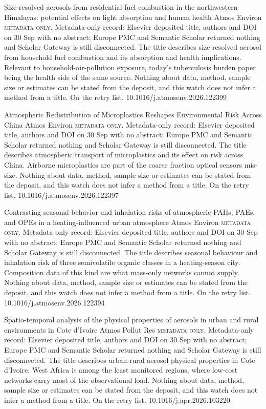 \documentclass[10pt]{article}
\begin{document}
{Size-resolved aerosols from residential fuel combustion in the northwestern Himalayas: potential effects on light absorption and human health}
{Atmos Environ}
{\textsc{metadata only.} Metadata-only record: Elsevier deposited title, authors and DOI on 30 Sep with no abstract; Europe PMC and Semantic Scholar returned nothing and Scholar Gateway is still disconnected. The title describes size-resolved aerosol from household fuel combustion and its absorption and health implications. Relevant to household-air-pollution exposure, today's tuberculosis burden paper being the health side of the same source. Nothing about data, method, sample size or estimates can be stated from the deposit, and this watch does not infer a method from a title. On the retry list.}
{10.1016/j.atmosenv.2026.122399}

{Atmospheric Redistribution of Microplastics Reshapes Environmental Risk Across China}
{Atmos Environ}
{\textsc{metadata only.} Metadata-only record: Elsevier deposited title, authors and DOI on 30 Sep with no abstract; Europe PMC and Semantic Scholar returned nothing and Scholar Gateway is still disconnected. The title describes atmospheric transport of microplastics and its effect on risk across China. Airborne microplastics are part of the coarse fraction optical sensors mis-size. Nothing about data, method, sample size or estimates can be stated from the deposit, and this watch does not infer a method from a title. On the retry list.}
{10.1016/j.atmosenv.2026.122397}

{Contrasting seasonal behavior and inhalation risks of atmospheric PAHs, PAEs, and OPEs in a heating-influenced urban atmosphere}
{Atmos Environ}
{\textsc{metadata only.} Metadata-only record: Elsevier deposited title, authors and DOI on 30 Sep with no abstract; Europe PMC and Semantic Scholar returned nothing and Scholar Gateway is still disconnected. The title describes seasonal behaviour and inhalation risk of three semivolatile organic classes in a heating-season city. Composition data of this kind are what mass-only networks cannot supply. Nothing about data, method, sample size or estimates can be stated from the deposit, and this watch does not infer a method from a title. On the retry list.}
{10.1016/j.atmosenv.2026.122394}

{Spatio-temporal analysis of the physical properties of aerosols in urban and rural environments in Cote d'Ivoire}
{Atmos Pollut Res}
{\textsc{metadata only.} Metadata-only record: Elsevier deposited title, authors and DOI on 30 Sep with no abstract; Europe PMC and Semantic Scholar returned nothing and Scholar Gateway is still disconnected. The title describes urban-rural aerosol physical properties in Cote d'Ivoire. West Africa is among the least monitored regions, where low-cost networks carry most of the observational load. Nothing about data, method, sample size or estimates can be stated from the deposit, and this watch does not infer a method from a title. On the retry list.}
{10.1016/j.apr.2026.103220}
\end{document}
